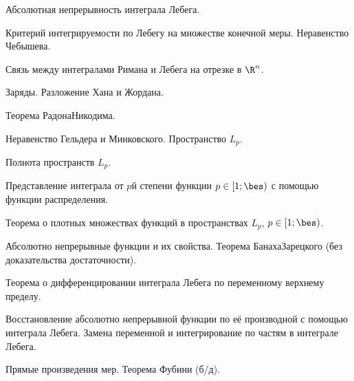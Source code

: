 \documentclass[a4paper]{article}
\begin{document}
\begin{nums}{-1}
\item Абсолютная непрерывность интеграла Лебега.
\item Критерий интегрируемости по Лебегу на множестве конечной меры. Неравенство Чебышева.
\item Связь между интегралами Римана и Лебега на отрезке в $\R^n$.
\item Заряды. Разложение Хана и Жордана.
\item Теорема Радона\ч Никодима.
\item Неравенство Гельдера и Минковского. Пространство $L_p$.
\item Полнота пространств $L_p$.
\item Представление интеграла от $p$\д й степени функции $p\in [1;\bes)$ с помощью функции распределения.
\item Теорема о плотных множествах функций в пространствах $L_p$, $p\in[1; \bes)$.
\item Абсолютно непрерывные функции и их свойства. Теорема Банаха\ч Зарецкого (без доказательства достаточности).
\item Теорема о дифференцировании интеграла Лебега по переменному верхнему пределу.
\item Восстановление абсолютно непрерывной функции по её производной с помощью
интеграла Лебега. Замена переменной и интегрирование по частям в интеграле Лебега.
\item Прямые произведения мер. Теорема Фубини (б/д).
\end{nums}

\medskip\dmvntrail
\end{document}
